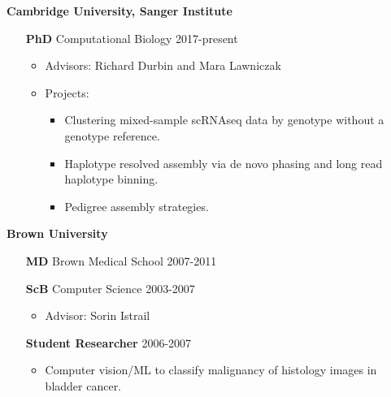 \documentclass[10pt]{res}
\begin{document}
\begin{resume}
	{\bf Cambridge University, Sanger Institute}
	\begin{itemize}[leftmargin=0.75in,topsep=2pt,noitemsep]
		\item[{\bf PhD}]  Computational Biology \hfill 2017-present 
		\begin{itemize}[label=$\bullet$, leftmargin=0.0in,noitemsep,topsep=-5pt]
			\item Advisors: Richard Durbin and Mara Lawniczak
			\item Projects:
				\begin{itemize}[noitemsep]
					\item Clustering mixed-sample scRNAseq data by genotype without a genotype reference.
					\item Haplotype resolved assembly via de novo phasing and long read haplotype binning.
					\item Pedigree assembly strategies.
				\end{itemize}
		\end{itemize}
	\end{itemize}
	{\bf Brown University}
	\begin{itemize}[leftmargin=0.75in,topsep=2pt, noitemsep]
		\item[{\bf MD}] Brown Medical School \hfill 2007-2011 
		\item[{\bf ScB}] Computer Science \hfill 2003-2007
			\begin{itemize}[label=$\bullet$, leftmargin=0.0in, noitemsep,topsep=-5pt]
				\item Advisor: Sorin Istrail
			\end{itemize}
	\end{itemize}
	\begin{itemize}[leftmargin=1.85in,topsep=5pt, noitemsep]
		\item[{\bf Student Researcher}] \hfill 2006-2007
			\begin{itemize}[label=$\bullet$, leftmargin=-1.1in, noitemsep,topsep=-5pt]
				\item Computer vision/ML to classify malignancy of histology images in bladder cancer.
			\end{itemize}
	\end{itemize}


\end{resume}
\end{document}
